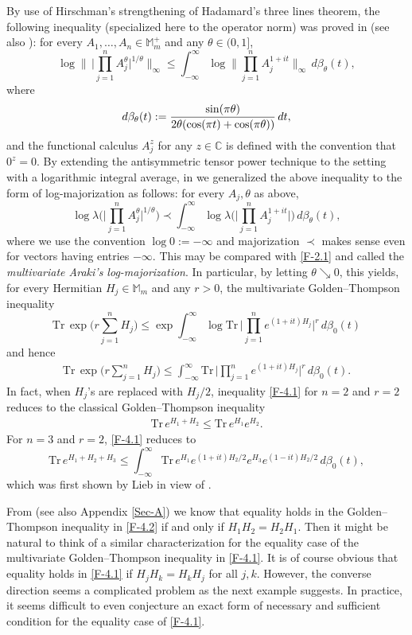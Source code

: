 \documentclass[11pt,reqno]{article}
\numberwithin{equation}{section}
\def\bC{\mathbb{C}}
\def\bM{\mathbb{M}}
\def\Tr{\mathrm{Tr}}
\begin{document}
By use of Hirschman's strengthening  of Hadamard's three lines theorem, the following inequality (specialized
here to the operator norm) was proved in \cite{SBT} (see also \cite[Appendix]{HKT}): for every
$A_1,\dots,A_n\in\bM_m^+$ and any $\theta\in(0,1]$,
\[
\log\Bigg\|\,\Bigg|\prod_{j=1}^nA_j^\theta\Bigg|^{1/\theta}\Bigg\|_\infty
\le\int_{-\infty}^\infty\log\Bigg\|\prod_{j=1}^nA_j^{1+it}\Bigg\|_\infty\,d\beta_\theta(t),
\]
where
\[
d\beta_\theta(t):={\sin(\pi\theta)\over2\theta(\cos(\pi t)+\cos(\pi\theta))}\,dt,
\]
and the functional calculus $A_j^z$ for any $z\in\bC$ is defined with the convention that $0^z=0$. By extending
the antisymmetric tensor power technique to the setting with a logarithmic integral average, in \cite[(112)]{HKT}
we generalized the above inequality to the form of log-majorization as follows: for every $A_j,\theta$ as above,
\[
\log\lambda\Biggl(\Bigg|\prod_{j=1}^nA_j^\theta\Bigg|^{1/\theta}\Biggr)
\prec\int_{-\infty}^\infty\log\lambda\Bigg(\Bigg|\prod_{j=1}^nA_j^{1+it}\Bigg|\Biggr)\,d\beta_\theta(t),
\]
where we use the convention $\log0:=-\infty$ and majorization $\prec$ makes sense even for vectors having
entries $-\infty$. This may be compared with \eqref{F-2.1} and called the \emph{multivariate Araki's log-majorization}.
In particular, by letting $\theta\searrow0$, this yields, for every Hermitian $H_j\in\bM_m$ and any $r>0$, the
multivariate Golden--Thompson inequality \cite[Corollary 18]{HKT}
\[
\Tr\,\exp\Biggl(r\sum_{j=1}^nH_j\Biggr)
\le\exp\int_{-\infty}^\infty\log\Tr\,\Bigg|\prod_{j=1}^ne^{(1+it)H_j}\Bigg|^r\,d\beta_0(t)
\]
and hence
\begin{align}\label{F-4.1}
\Tr\,\exp\Biggl(r\sum_{j=1}^nH_j\Biggr)
\le\int_{-\infty}^\infty\Tr\,\Bigg|\prod_{j=1}^ne^{(1+it)H_j}\Bigg|^r\,d\beta_0(t).
\end{align}
In fact, when $H_j$'s are replaced with $H_j/2$, inequality \eqref{F-4.1} for $n=2$ and $r=2$ reduces to the
classical Golden--Thompson inequality
\begin{align}\label{F-4.2}
\Tr\,e^{H_1+H_2}\le\Tr\,e^{H_1}e^{H_2}.
\end{align}
For $n=3$ and $r=2$, \eqref{F-4.1} reduces to
\[
\Tr\,e^{H_1+H_2+H_3}\le\int_{-\infty}^\infty\Tr\,e^{H_1}e^{(1+it)H_2/2}e^{H_3}e^{(1-it)H_2/2}\,d\beta_0(t),
\]
which was first shown by Lieb \cite[Theorem 7]{Li} in view of \cite[Lemma 3.4]{SBT}.

From \cite[Theorem 2.1]{Hi} (see also Appendix \ref{Sec-A}) we know that equality holds in the
Golden--Thompson inequality in \eqref{F-4.2} if and only if $H_1H_2=H_2H_1$. Then it might be natural to think
of a similar characterization for the equality case of the multivariate Golden--Thompson inequality in \eqref{F-4.1}.
It is of course obvious that equality holds in \eqref{F-4.1} if $H_jH_k=H_kH_j$ for all $j,k$. However, the converse
direction seems a complicated problem as the next example suggests. In practice, it seems difficult to even
conjecture an exact form of necessary and sufficient condition for the equality case of \eqref{F-4.1}.
\end{document}
